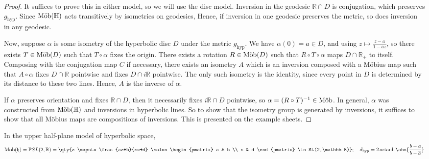 \begin{proof}
	It suffices to prove this in either model, so we will use the disc model.
	Inversion in the geodesic $\mathbb R \cap D$ is conjugation, which preserves $g_{\text{hyp}}$.
	Since $\text{M\"ob}(\mathbb H)$ acts transitively by isometries on geodesics, %
	Hence, if inversion in one geodesic preserves the metric, so does inversion in any geodesic.

	Now, suppose $\alpha$ is some isometry of the hyperbolic disc $D$ under the metric $g_{\text{hyp}}$.
	We have $\alpha(0) = a \in D$, and using $z \mapsto \frac{z - a}{1 - \overline a z}$, so there exists $T \in \text{M\"ob}(D)$ such that $T \circ \alpha$ fixes the origin.
	There exists a rotation $R \in \text{M\"ob}(D)$ such that $R \circ T \circ \alpha$ maps $D \cap \mathbb R_+$ to itself.
	Composing with the conjugation map $C$ if necessary, there exists an isometry $A$ which is an inversion composed with a M\"obius map such that $A \circ \alpha$ fixes $D \cap \mathbb R$ pointwise and fixes $D \cap i\mathbb R$ pointwise.
	The only such isometry is the identity, since every point in $D$ is determined by its distance to these two lines.
	Hence, $A$ is the inverse of $\alpha$.

	If $\alpha$ preserves orientation and fixes $\mathbb R \cap D$, then it necessarily fixes $i\mathbb R \cap D$ pointwise, so $\alpha = (R \circ T)^{-1} \in \text{M\"ob}$.
	In general, $\alpha$ was constructed from $\text{M\"ob}(\mathbb H)$ and inversions in hyperbolic lines.
	So to show that the isometry group is generated by inversions, it suffices to show that all M\"obius maps are compositions of inversions.
	This is presented on the example sheets.
\end{proof}
In the upper half-plane model of hyperbolic space,
\begin{align*}
	\Mob(\mathfrak{h}) = \mathbb PSL(2,\mathbb R) = \qty{z \mapsto \frac{az+b}{cz+d} \colon \begin{pmatrix}
			a & b \\
			c & d
		\end{pmatrix} \in SL(2,\mathbb R)};\quad d_{\text{hyp}} = 2 \artanh \abs{\frac{b - a}{b - \overline a}}
\end{align*}

